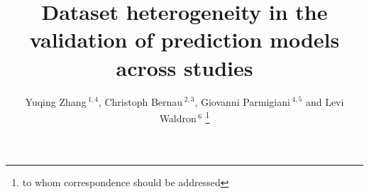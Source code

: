 \documentclass{bioinfo}
\begin{document}

\title[Cross-study validation]{Dataset heterogeneity in the validation of prediction models across studies}
\author[Zhang \textit{et~al}]{Yuqing Zhang\,$^{1,4}$, Christoph Bernau\,$^{2,3}$, Giovanni Parmigiani\,$^{4,5}$ and Levi Waldron\,$^{6}$ \footnote{to whom correspondence should be addressed}}
\address{$^{1}$Boston University Bioinformatics Program, Boston, U.S.A\\
$^{2}$Leibniz Supercomputing Center, Garching, Germany\\
$^{3}$Department for Medical Informatics, Biometry and Epidemiology, Munich, Germany \\
$^{4}$Dana-Farber Cancer Institute, Boston, U.S.A\\
$^{5}$Harvard School of Public Health, Boston, U.S.A\\
$^{6}$School of Urban Public Health at Hunter College, City University of New York, New York, U.S.A}



\maketitle
\end{document}
